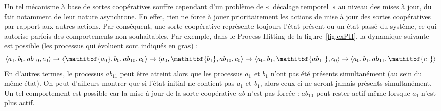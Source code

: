 Un tel mécanisme à base de sortes coopératives souffre cependant d'un problème de «~décalage temporel~» au niveau des mises à jour, du fait notamment de leur nature asynchrone.
En effet, rien ne force à jouer prioritairement les actions de mise à jour des sortes coopératives par rapport aux autres actions.
Par conséquent, une sorte coopérative représente toujours l'état présent ou un état passé du système, ce qui autorise parfois des comportements non souhaitables.
Par exemple, dans le Process Hitting de la figure~\ref{fig:exPH}, la dynamique suivante est possible (les processus qui évoluent sont indiqués en gras) :
$$
  \PHetat{a_1, b_0, ab_{10}, c_0} \rightarrow
  \PHetat{\mathitbf{a_0}, b_0, ab_{10}, c_0} \rightarrow
  \PHetat{a_0, \mathitbf{b_1}, ab_{10}, c_0} \rightarrow
  \PHetat{a_0, b_1, \mathitbf{ab_{11}}, c_0} \rightarrow
  \PHetat{a_0, b_1, ab_{11}, \mathitbf{c_1}}
$$
En d'autres termes, le processus $ab_{11}$ peut être atteint alors que les processus $a_1$ et $b_1$ n'ont pas été présents simultanément (\ie au sein du même état).
On peut d'ailleurs montrer que si l'état initial ne contient pas $a_1$ et $b_1$, alors ceux-ci ne seront jamais présents simultanément.
Un tel comportement est possible car la mise à jour de la sorte coopérative $ab$ n'est pas forcée :
$ab_{10}$ peut rester actif même lorsque $a_1$ n'est plus actif.

